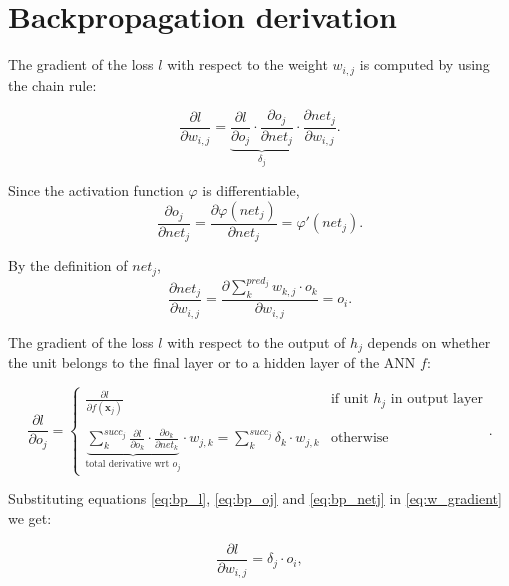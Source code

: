 \chapter{Backpropagation derivation}
\label{sec:appendix_backprop}

The gradient of the loss $l$ with respect to the weight $w_{i,j}$ is computed by using the chain rule:

\begin{equation}
\label{eq:w_gradient}
\frac{\partial l}{\partial w_{i,j}} = \underbrace{\frac{\partial l}{\partial o_j} \cdot \frac{\partial o_j}{\partial net_j}}_\textrm{$\delta_j$} \cdot \frac{\partial net_j}{\partial w_{i,j}}.
\end{equation}

Since the activation function $\varphi$ is differentiable,
\begin{equation}
\label{eq:bp_oj}
\frac{\partial o_j}{\partial net_j} = \frac{\partial \varphi(net_j)}{\partial net_j} = \varphi\prime(net_j).
\end{equation}

By the definition of $net_j$,
\begin{equation}
\label{eq:bp_netj}
\frac{\partial net_j}{\partial w_{i,j}} = \frac{\partial \sum\limits_{k}^{pred_j} w_{k,j} \cdot o_k}{\partial w_{i,j}} = o_i.
\end{equation}

The gradient of the loss $l$ with respect to the output of $h_j$ depends on whether the unit belongs to the final layer or to a hidden layer of the ANN $f$:

\begin{equation}
\label{eq:bp_l}
\frac{\partial l}{\partial o_j} = 
\begin{cases}
     \frac{\partial l}{\partial f(\bm{x}_j)} & \text{if unit $h_j$ in output layer}\\ \\
     \underbrace{\sum\limits_{k}^{succ_j} \frac{\partial l}{\partial o_k} \cdot \frac{\partial o_k}{\partial net_k}}_\textrm{total derivative wrt $o_j$} \cdot w_{j,k} = \sum\limits_{k}^{succ_j} \delta_k \cdot w_{j,k} & \text{otherwise}
\end{cases}.
\end{equation}

Substituting equations \eqref{eq:bp_l}, \eqref{eq:bp_oj} and \eqref{eq:bp_netj} in \eqref{eq:w_gradient} we get:

\begin{equation}
\label{eq:bp_final_new}
\frac{\partial l}{\partial w_{i,j}} = \delta_j \cdot o_i,
\end{equation}

